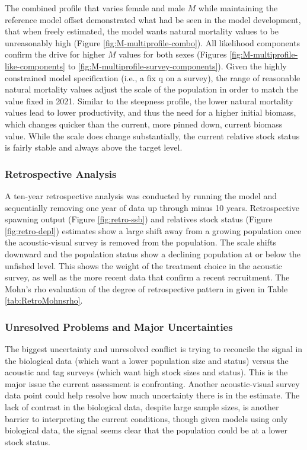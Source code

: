 \documentclass[11pt,
  english,
  letterpaper,
]{article}
\begin{document}
The combined profile that varies female and male \(M\) while maintaining the reference model offset demonstrated what had be seen in the model development, that when freely estimated, the model wants natural mortality values to be unreasonably high (Figure \ref{fig:M-multiprofile-combo}). All likelihood components confirm the drive for higher \(M\) values for both sexes (Figures \ref{fig:M-multiprofile-like-components} to \ref{fig:M-multiprofile-survey-components}). Given the highly constrained model specification (i.e., a fix q on a survey), the range of reasonable natural mortality values adjust the scale of the population in order to match the value fixed in 2021. Similar to the steepness profile, the lower natural mortality values lead to lower productivity, and thus the need for a higher initial biomass, which changes quicker than the current, more pinned down, current biomass value. While the scale does change substantially, the current relative stock status is fairly stable and always above the target level.

\hypertarget{retrospective-analysis}{%
\subsubsection{Retrospective Analysis}\label{retrospective-analysis}}

A ten-year retrospective analysis was conducted by running the model and sequentially removing one year of data up through minus 10 years. Retrospective spawning output (Figure \ref{fig:retro-ssb}) and relatives stock status (Figure \ref{fig:retro-depl}) estimates show a large shift away from a growing population once the acoustic-visual survey is removed from the population. The scale shifts downward and the population status show a declining population at or below the unfished level. This shows the weight of the treatment choice in the acoustic survey, as well as the more recent data that confirm a recent recruitment. The Mohn's rho evaluation of the degree of retrospective pattern in given in Table \ref{tab:RetroMohnsrho}.

\hypertarget{unresolved-problems-and-major-uncertainties-1}{%
\subsubsection{Unresolved Problems and Major Uncertainties}\label{unresolved-problems-and-major-uncertainties-1}}

The biggest uncertainty and unresolved conflict is trying to reconcile the signal in the biological data (which want a lower population size and status) versus the acoustic and tag surveys (which want high stock sizes and status). This is the major issue the current assessment is confronting. Another acoustic-visual survey data point could help resolve how much uncertainty there is in the estimate. The lack of contrast in the biological data, despite large sample sizes, is another barrier to interpreting the current conditions, though given models using only biological data, the signal seems clear that the population could be at a lower stock status.
\end{document}
